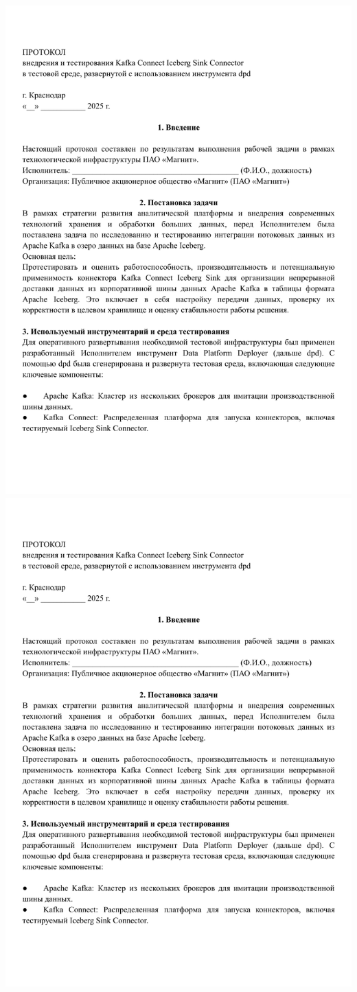 \includegraphics[scale=0.75,page=6]{my_folder/images/vkr_magnit.pdf}
\clearpage
\includegraphics[scale=0.75,page=7]{my_folder/images/vkr_magnit.pdf}

